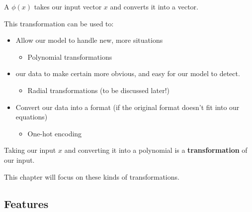         \begin{definition}
            A  $\phi(x)$ takes our input vector $x$ and converts it into a  vector.

            This transformation can be used to:

            \begin{itemize}
                \item Allow our model to handle new, more  situations 
                
                    \begin{itemize}
                        \item \miniex Polynomial transformations
                    \end{itemize}

                \item {} our data to make certain  more obvious, and easy for our model to detect.

                    \begin{itemize}
                        \item \miniex Radial transformations (to be discussed later!)
                    \end{itemize}
                
                \item Convert our data into a  format (if the original format doesn't fit into our equations)

                    \begin{itemize}
                        \item \miniex One-hot encoding
                    \end{itemize}
                
            \end{itemize}
        \end{definition}

        \miniex Taking our input $x$ and converting it into a polynomial is a \textbf{transformation} of our input.

        This chapter will focus on these kinds of transformations. 

    \subsecdiv

    \subsection*{Features}
        
